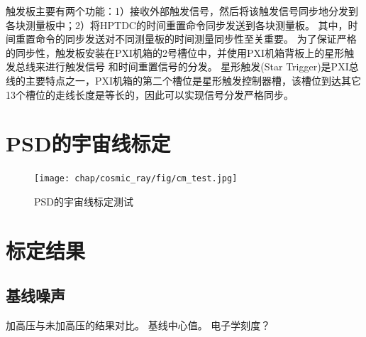 触发板主要有两个功能：1）接收外部触发信号，然后将该触发信号同步地分发到各块测量板中；2）将HPTDC的时间重置命令同步发送到各块测量板。
其中，时间重置命令的同步发送对不同测量板的时间测量同步性至关重要。
为了保证严格的同步性，触发板安装在PXI机箱的2号槽位中，并使用PXI机箱背板上的星形触发总线来进行触发信号
和时间重置信号的分发。
星形触发(Star Trigger)是PXI总线的主要特点之一，PXI机箱的第二个槽位是星形触发控制器槽，该槽位到达其它13个槽位的走线长度是等长的，因此可以实现信号分发严格同步。


\section{PSD的宇宙线标定}
\label{sec:cosmic_ray:cm_test}
\begin{figure}[htbp]
	\centering
	\texttt{[image: chap/cosmic\_ray/fig/cm\_test.jpg]}
	\caption{PSD的宇宙线标定测试}
	\label{fig:cosmic_ray:cm_test}
\end{figure}

\section{标定结果}
\label{sec:cosmic_ray:results}
\subsection{基线噪声}
加高压与未加高压的结果对比。
基线中心值。
电子学刻度？

